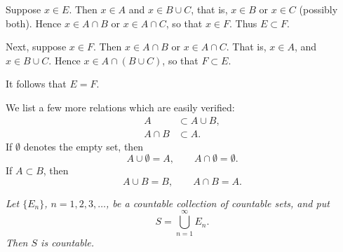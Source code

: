 Suppose $x \in E$. Then $x \in A$ and $x \in B \cup C$, that is, $x \in B$ or
$x \in C$ (possibly both). Hence $x \in A \cap B$ or $x \in A \cap C$, so that
$x \in F$. Thus $E \subset F$.

Next, suppose $x \in F$. Then $x \in A \cap B$ or $x \in A \cap C$. That is,
$x \in A$, and $x \in B \cup C$. Hence $x \in A \cap (B \cup C)$, so that
$F \subset E$.

It follows that $E = F$.

We list a few more relations which are easily verified:
\begin{align}
  A &\subset A \cup B, \tag{2.11}\\
  A \cap B &\subset A. \tag{2.12}
\end{align}
If $\emptyset$ denotes the empty set, then
\begin{equation}
  A \cup \emptyset = A, \qquad A \cap \emptyset = \emptyset. \tag{2.13}
\end{equation}
If $A \subset B$, then
\begin{equation}
  A \cup B = B, \qquad A \cap B = A. \tag{2.14}
\end{equation}

\emph{Let $\{E_n\}$, $n = 1,2,3,\dots$, be a countable collection of countable
sets, and put}
\begin{equation}
  S = \bigcup_{n=1}^{\infty} E_n. \tag{2.15}
\end{equation}
\emph{Then $S$ is countable.}

